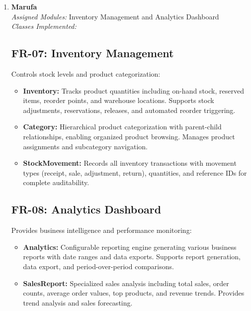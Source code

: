 \begin{enumerate}
\begin{itemize}
    \item \textbf{TrackingUpdate:} Captures granular shipment milestones including status changes, location updates, and timestamps for complete delivery timeline visualization.
\end{itemize}


\item \textbf{Marufa} \\
\textit{Assigned Modules:} Inventory Management and Analytics Dashboard \\
\textit{Classes Implemented:}
\subsection*{FR-07: Inventory Management}
Controls stock levels and product categorization:

\begin{itemize}
    \item \textbf{Inventory:} Tracks product quantities including on-hand stock, reserved items, reorder points, and warehouse locations. Supports stock adjustments, reservations, releases, and automated reorder triggering.
    
    \item \textbf{Category:} Hierarchical product categorization with parent-child relationships, enabling organized product browsing. Manages product assignments and subcategory navigation.
    
    \item \textbf{StockMovement:} Records all inventory transactions with movement types (receipt, sale, adjustment, return), quantities, and reference IDs for complete auditability.
\end{itemize}
\subsection*{FR-08: Analytics Dashboard}
Provides business intelligence and performance monitoring:

\begin{itemize}
    \item \textbf{Analytics:} Configurable reporting engine generating various business reports with date ranges and data exports. Supports report generation, data export, and period-over-period comparisons.
    
    \item \textbf{SalesReport:} Specialized sales analysis including total sales, order counts, average order values, top products, and revenue trends. Provides trend analysis and sales forecasting.
    

\end{itemize}
\end{enumerate}
